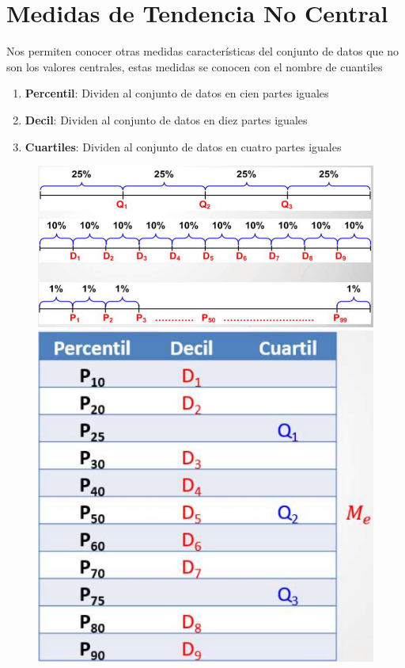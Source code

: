 \documentclass{article}
\begin{document}
\section{Medidas de Tendencia No Central}
    Nos permiten conocer otras medidas características del conjunto de datos que no son los valores centrales, estas medidas se conocen con el nombre de cuantiles
    \begin{enumerate}
        \item\textbf{Percentil}: Dividen al conjunto de datos en cien partes iguales
        \item\textbf{Decil}: Dividen al conjunto de datos en diez partes iguales
        \item\textbf{Cuartiles}: Dividen al conjunto de datos en cuatro partes iguales
    \end{enumerate}
    \begin{figure}[H]
        \centering
        \begin{minipage}{0.5\textwidth}
            \centering
            \includegraphics[width=\textwidth]{img/noCentral.png}
        \end{minipage}%
        \hfill
        \begin{minipage}{0.5\textwidth}
            \centering
            \includegraphics[width=\textwidth]{img/equivalencia.png}
        \end{minipage}
    \end{figure}
    
\end{document}
